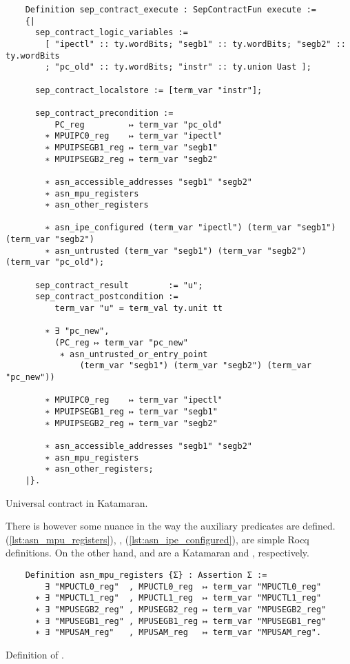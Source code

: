 \begin{listing}
  \begin{verbatim}
    Definition sep_contract_execute : SepContractFun execute :=
    {|
      sep_contract_logic_variables :=
        [ "ipectl" :: ty.wordBits; "segb1" :: ty.wordBits; "segb2" :: ty.wordBits
        ; "pc_old" :: ty.wordBits; "instr" :: ty.union Uast ];

      sep_contract_localstore := [term_var "instr"];

      sep_contract_precondition :=
          PC_reg         ↦ term_var "pc_old"
        ∗ MPUIPC0_reg    ↦ term_var "ipectl"
        ∗ MPUIPSEGB1_reg ↦ term_var "segb1"
        ∗ MPUIPSEGB2_reg ↦ term_var "segb2"

        ∗ asn_accessible_addresses "segb1" "segb2"
        ∗ asn_mpu_registers
        ∗ asn_other_registers

        ∗ asn_ipe_configured (term_var "ipectl") (term_var "segb1") (term_var "segb2")
        ∗ asn_untrusted (term_var "segb1") (term_var "segb2") (term_var "pc_old");

      sep_contract_result        := "u";
      sep_contract_postcondition :=
          term_var "u" = term_val ty.unit tt

        ∗ ∃ "pc_new",
          (PC_reg ↦ term_var "pc_new"
           ∗ asn_untrusted_or_entry_point
               (term_var "segb1") (term_var "segb2") (term_var "pc_new"))

        ∗ MPUIPC0_reg    ↦ term_var "ipectl"
        ∗ MPUIPSEGB1_reg ↦ term_var "segb1"
        ∗ MPUIPSEGB2_reg ↦ term_var "segb2"

        ∗ asn_accessible_addresses "segb1" "segb2"
        ∗ asn_mpu_registers
        ∗ asn_other_registers;
    |}.
  \end{verbatim}
  \caption{Universal contract in Katamaran.}
  \label{lst:universal-contract}
\end{listing}

There is however some nuance in the way the auxiliary predicates are defined.  (\cref{lst:asn_mpu_registers}), ,  (\cref{lst:asn_ipe_configured}),  are simple Rocq definitions. On the other hand,  and  are a Katamaran  and , respectively.

\begin{listing}
  \begin{verbatim}
    Definition asn_mpu_registers {Σ} : Assertion Σ :=
        ∃ "MPUCTL0_reg"  , MPUCTL0_reg  ↦ term_var "MPUCTL0_reg"
      ∗ ∃ "MPUCTL1_reg"  , MPUCTL1_reg  ↦ term_var "MPUCTL1_reg"
      ∗ ∃ "MPUSEGB2_reg" , MPUSEGB2_reg ↦ term_var "MPUSEGB2_reg"
      ∗ ∃ "MPUSEGB1_reg" , MPUSEGB1_reg ↦ term_var "MPUSEGB1_reg"
      ∗ ∃ "MPUSAM_reg"   , MPUSAM_reg   ↦ term_var "MPUSAM_reg".
  \end{verbatim}
  \caption{Definition of .}
  \label{lst:asn_mpu_registers}
\end{listing}

